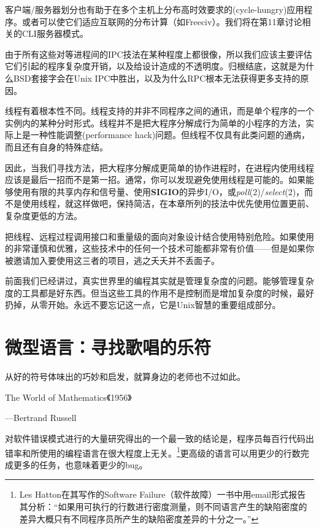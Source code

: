 \documentclass[12pt,oneside]{ctexbook}
\begin{document}
\begin{common-format}
客户端/服务器划分也有助于在多个主机上分布高时效要求的(cycle-hungry)应用程序。或者可以使它们适应互联网的分布计算（如Freeciv）。我们将在第11章讨论相关的CLI服务器模式。

由于所有这些对等进程间的IPC技法在某种程度上都很像，所以我们应该主要评估它们引起的程序复杂度开销，以及给设计造成的不透明度。归根结底，这就是为什么BSD套接字会在Unix IPC中胜出，以及为什么RPC根本无法获得更多支持的原因。

线程有着根本性不同。线程支持的并非不同程序之间的通讯，而是单个程序的一个实例内的某种分时形式。线程并不是把大程序分解成行为简单的小程序的方法，实际上是一种性能调整(performance hack)问题。但线程不仅具有此类问题的通病，而且还有自身的特殊症结。

因此，当我们寻找方法，把大程序分解成更简单的协作进程时，在进程内使用线程应该是最后一招而不是第一招。通常，你可以发现避免使用线程是可能的。如果能够使用有限的共享内存和信号量、使用\textbf{SIGIO}的异步I/O，或\textit{poll}(2)/\textit{select}(2)，而不是使用线程，就这样做吧，保持简洁，在本章所列的技法中优先使用位置更前、复杂度更低的方法。

把线程、远程过程调用接口和重量级的面向对象设计结合使用特别危险。如果使用的非常谨慎和优雅，这些技术中的任何一个技术可能都非常有价值——但是如果你被邀请加入要使用这三者的项目，逃之夭夭并不丢面子。

前面我们已经讲过，真实世界里的编程其实就是管理复杂度的问题。能够管理复杂度的工具都是好东西。但当这些工具的作用不是控制而是增加复杂度的时候，最好扔掉，从零开始。永远不要忘记这一点，它是Unix智慧的重要组成部分。


\chapter{微型语言：寻找歌唱的乐符}
\begin{flushright}
\begin{notecard}{23em}
从好的符号体味出的巧妙和启发，就算身边的老师也不过如此。

{\hfill  The World of Mathematics《1956》}

{\hfill —Bertrand Russell}
\end{notecard}
\end{flushright}

对软件错误模式进行的大量研究得出的一个最一致的结论是，程序员每百行代码出错率和所使用的编程语言在很大程度上无关。\footnote{Les Hatton在其写作的Software Failure（软件故障）一书中用email形式报告其分析：“如果用可执行的行数进行密度测量，则不同语言产生的缺陷密度的差异大概只有不同程序员所产生的缺陷密度差异的十分之一。”}更高级的语言可以用更少的行数完成更多的任务，也意味着更少的bug。


\end{common-format}
\end{document}
